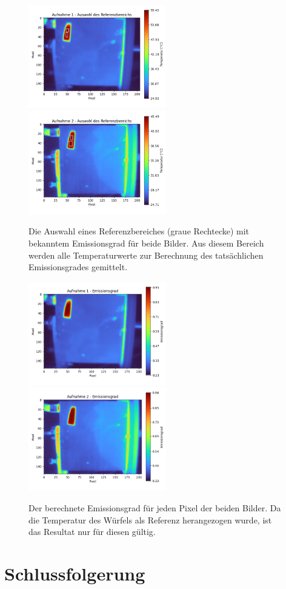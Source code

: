 \documentclass{article}
\begin{document}
\begin{figure}[H]
    \centering
    \captionsetup{width=12cm}
    \includegraphics[width=6cm]{img/ref_sel_1.png}
    \includegraphics[width=6cm]{img/ref_sel_2.png}
    \caption{
        Die Auswahl eines Referenzbereiches (graue Rechtecke) mit bekanntem Emissionsgrad für beide Bilder.
        Aus diesem Bereich werden alle Temperaturwerte zur Berechnung des tatsächlichen Emissionsgrades gemittelt. 
    }
\end{figure}

\begin{figure}[H]
    \centering
    \captionsetup{width=12cm}
    \includegraphics[width=6cm]{img/eps_1.png}
    \includegraphics[width=6cm]{img/eps_2.png}
    \caption{
        Der berechnete Emissionsgrad für jeden Pixel der beiden Bilder.
        Da die Temperatur des Würfels als Referenz herangezogen wurde, ist das Resultat nur für diesen gültig.
    }
\end{figure}

\section{Schlussfolgerung}
\end{document}
